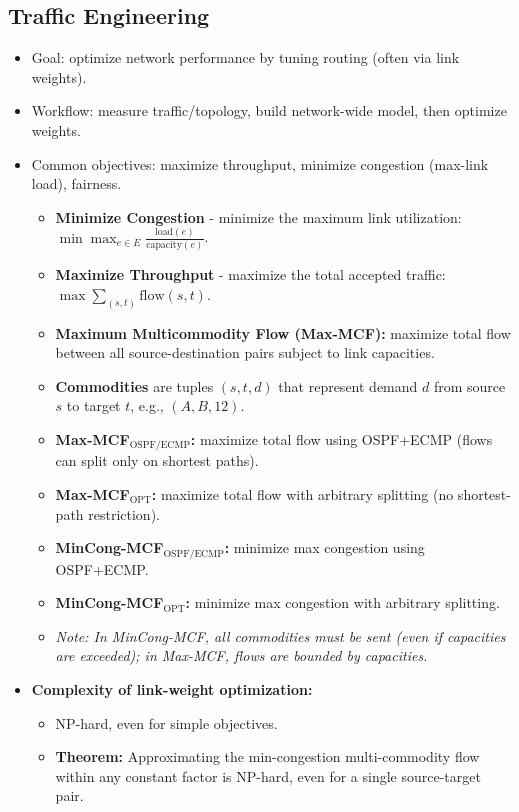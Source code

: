 \subsection{Traffic Engineering}
\begin{itemize}
	\item Goal: optimize network performance by tuning routing (often via link weights).
	\item Workflow: measure traffic/topology, build network-wide model, then optimize weights.
	\item Common objectives: maximize throughput, minimize congestion (max-link load), fairness.
	\begin{itemize}
		\item \textbf{Minimize Congestion} - minimize the maximum link utilization: \\ $\min \max_{e\in E} \frac{\text{load}(e)}{\text{capacity}(e)}$.
		\item \textbf{Maximize Throughput} - maximize the total accepted traffic: \\ $\max \sum_{(s,t)} \text{flow}(s,t)$.
		\item \textbf{Maximum Multicommodity Flow (Max-MCF):} maximize total flow between all source-destination pairs subject to link capacities.
		\item \textbf{Commodities} are tuples $(s,t,d)$ that represent demand $d$ from source $s$ to target $t$, e.g., $(A,B,12)$.
		\item \textbf{Max-MCF$_{\text{OSPF/ECMP}}$:} maximize total flow using OSPF+ECMP (flows can split only on shortest paths).
		\item \textbf{Max-MCF$_{\text{OPT}}$:} maximize total flow with arbitrary splitting (no shortest-path restriction).
		\item \textbf{MinCong-MCF$_{\text{OSPF/ECMP}}$:} minimize max congestion using OSPF+ECMP.
		\item \textbf{MinCong-MCF$_{\text{OPT}}$:} minimize max congestion with arbitrary splitting.
		\item[] \textit{Note: In MinCong-MCF, all commodities must be sent (even if capacities are exceeded); in Max-MCF, flows are bounded by capacities.}
	\end{itemize}
	\item \textbf{Complexity of link-weight optimization:}
	\begin{itemize}
		\item NP-hard, even for simple objectives.
		\item \textbf{Theorem:} Approximating the min-congestion multi-commodity flow within any constant factor is NP-hard, even for a single source-target pair.
	\end{itemize}
\end{itemize}

